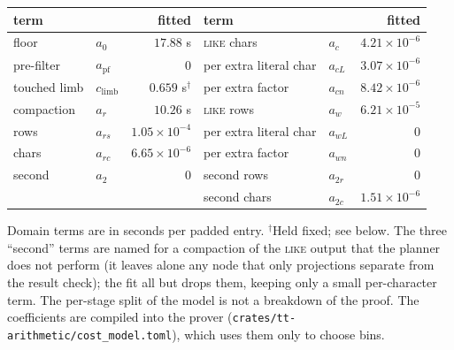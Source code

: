 \begin{center}
\begin{tabular}{llr@{\qquad}llr}
  term & & fitted & term & & fitted \\
  \hline
  floor & $a_0$ & $17.88$ s &
  \textsc{like} chars & $a_c$ & $4.21 \times 10^{-6}$ \\
  pre-filter & $a_{\mathrm{pf}}$ & $0$ &
  \quad per extra literal char & $a_{cL}$ & $3.07 \times 10^{-6}$ \\
  touched limb & $c_{\mathrm{limb}}$ & $0.659$ s$^\dagger$ &
  \quad per extra factor & $a_{cn}$ & $8.42 \times 10^{-6}$ \\
  compaction & $a_r$ & $10.26$ s &
  \textsc{like} rows & $a_w$ & $6.21 \times 10^{-5}$ \\
  \quad rows & $a_{rs}$ & $1.05 \times 10^{-4}$ &
  \quad per extra literal char & $a_{wL}$ & $0$ \\
  \quad chars & $a_{rc}$ & $6.65 \times 10^{-6}$ &
  \quad per extra factor & $a_{wn}$ & $0$ \\
  second & $a_2$ & $0$ &
  second rows & $a_{2r}$ & $0$ \\
  & & & second chars & $a_{2c}$ & $1.51 \times 10^{-6}$
\end{tabular}
\end{center}
Domain terms are in seconds per padded entry. $^\dagger$Held fixed; see
below. The three ``second'' terms are named for a compaction of the
\textsc{like} output that the planner does not perform (it leaves alone
any node that only projections separate from the result check); the fit
all but drops them, keeping only a small per-character term. The
per-stage split of the model is not a breakdown of the proof. The
coefficients are compiled into the prover
(\texttt{crates/tt-arithmetic/cost\_model.toml}), which uses them only to
choose bins.

